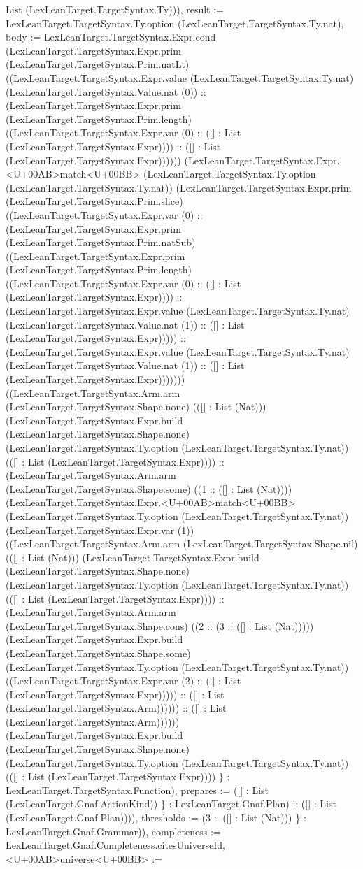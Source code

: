 \documentclass[11pt]{article}
\begin{document}
List (LexLeanTarget.TargetSyntax.Ty))), result := LexLeanTarget.TargetSyntax.Ty.option (LexLeanTarget.TargetSyntax.Ty.nat), body := LexLeanTarget.TargetSyntax.Expr.cond (LexLeanTarget.TargetSyntax.Expr.prim (LexLeanTarget.TargetSyntax.Prim.natLt) ((LexLeanTarget.TargetSyntax.Expr.value (LexLeanTarget.TargetSyntax.Ty.nat) (LexLeanTarget.TargetSyntax.Value.nat (0)) :: (LexLeanTarget.TargetSyntax.Expr.prim (LexLeanTarget.TargetSyntax.Prim.length) ((LexLeanTarget.TargetSyntax.Expr.var (0) :: ([] : List (LexLeanTarget.TargetSyntax.Expr)))) :: ([] : List (LexLeanTarget.TargetSyntax.Expr)))))) (LexLeanTarget.TargetSyntax.Expr.<U+00AB>match<U+00BB> (LexLeanTarget.TargetSyntax.Ty.option (LexLeanTarget.TargetSyntax.Ty.nat)) (LexLeanTarget.TargetSyntax.Expr.prim (LexLeanTarget.TargetSyntax.Prim.slice) ((LexLeanTarget.TargetSyntax.Expr.var (0) :: (LexLeanTarget.TargetSyntax.Expr.prim (LexLeanTarget.TargetSyntax.Prim.natSub) ((LexLeanTarget.TargetSyntax.Expr.prim (LexLeanTarget.TargetSyntax.Prim.length) ((LexLeanTarget.TargetSyntax.Expr.var (0) :: ([] : List (LexLeanTarget.TargetSyntax.Expr)))) :: (LexLeanTarget.TargetSyntax.Expr.value (LexLeanTarget.TargetSyntax.Ty.nat) (LexLeanTarget.TargetSyntax.Value.nat (1)) :: ([] : List (LexLeanTarget.TargetSyntax.Expr))))) :: (LexLeanTarget.TargetSyntax.Expr.value (LexLeanTarget.TargetSyntax.Ty.nat) (LexLeanTarget.TargetSyntax.Value.nat (1)) :: ([] : List (LexLeanTarget.TargetSyntax.Expr))))))) ((LexLeanTarget.TargetSyntax.Arm.arm (LexLeanTarget.TargetSyntax.Shape.none) (([] : List (Nat))) (LexLeanTarget.TargetSyntax.Expr.build (LexLeanTarget.TargetSyntax.Shape.none) (LexLeanTarget.TargetSyntax.Ty.option (LexLeanTarget.TargetSyntax.Ty.nat)) (([] : List (LexLeanTarget.TargetSyntax.Expr)))) :: (LexLeanTarget.TargetSyntax.Arm.arm (LexLeanTarget.TargetSyntax.Shape.some) ((1 :: ([] : List (Nat)))) (LexLeanTarget.TargetSyntax.Expr.<U+00AB>match<U+00BB> (LexLeanTarget.TargetSyntax.Ty.option (LexLeanTarget.TargetSyntax.Ty.nat)) (LexLeanTarget.TargetSyntax.Expr.var (1)) ((LexLeanTarget.TargetSyntax.Arm.arm (LexLeanTarget.TargetSyntax.Shape.nil) (([] : List (Nat))) (LexLeanTarget.TargetSyntax.Expr.build (LexLeanTarget.TargetSyntax.Shape.none) (LexLeanTarget.TargetSyntax.Ty.option (LexLeanTarget.TargetSyntax.Ty.nat)) (([] : List (LexLeanTarget.TargetSyntax.Expr)))) :: (LexLeanTarget.TargetSyntax.Arm.arm (LexLeanTarget.TargetSyntax.Shape.cons) ((2 :: (3 :: ([] : List (Nat))))) (LexLeanTarget.TargetSyntax.Expr.build (LexLeanTarget.TargetSyntax.Shape.some) (LexLeanTarget.TargetSyntax.Ty.option (LexLeanTarget.TargetSyntax.Ty.nat)) ((LexLeanTarget.TargetSyntax.Expr.var (2) :: ([] : List (LexLeanTarget.TargetSyntax.Expr))))) :: ([] : List (LexLeanTarget.TargetSyntax.Arm)))))) :: ([] : List (LexLeanTarget.TargetSyntax.Arm)))))) (LexLeanTarget.TargetSyntax.Expr.build (LexLeanTarget.TargetSyntax.Shape.none) (LexLeanTarget.TargetSyntax.Ty.option (LexLeanTarget.TargetSyntax.Ty.nat)) (([] : List (LexLeanTarget.TargetSyntax.Expr)))) \} : LexLeanTarget.TargetSyntax.Function), prepares := ([] : List (LexLeanTarget.Gnaf.ActionKind)) \} : LexLeanTarget.Gnaf.Plan) :: ([] : List (LexLeanTarget.Gnaf.Plan)))), thresholds := (3 :: ([] : List (Nat))) \} : LexLeanTarget.Gnaf.Grammar)), completeness := LexLeanTarget.Gnaf.Completeness.citesUniverseId, <U+00AB>universe<U+00BB> := 
\end{document}
